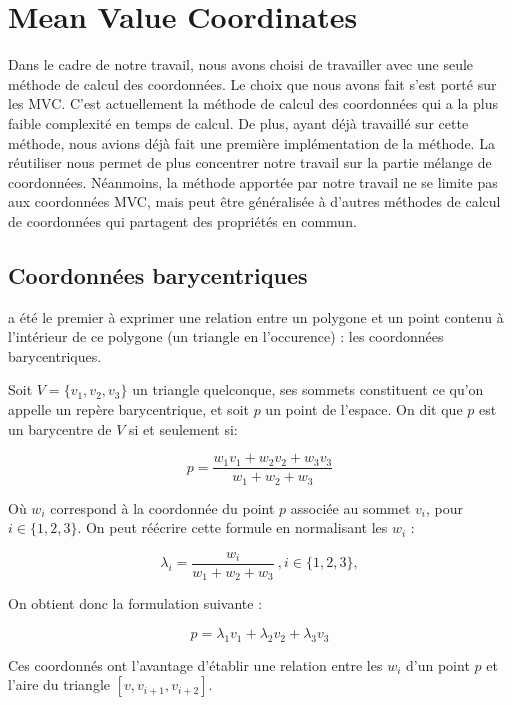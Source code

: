 \section{Mean Value Coordinates}

Dans le cadre de notre travail, nous avons choisi de travailler avec une seule
méthode de calcul des coordonnées. Le choix que nous avons fait s'est porté
sur les MVC. C'est actuellement la méthode de calcul des coordonnées qui a la
plus faible complexité en temps de calcul. De plus, ayant déjà travaillé sur
cette méthode, nous avions déjà fait une première implémentation de la
méthode. La réutiliser nous permet de plus concentrer notre travail sur la
partie mélange de coordonnées. Néanmoins, la méthode apportée par notre
travail ne se limite pas aux coordonnées MVC, mais peut être généralisée à
d'autres méthodes de calcul de coordonnées qui partagent des propriétés en
commun.

\subsection{Coordonnées barycentriques}

\cite{Mob27} a été le premier à exprimer une relation entre un polygone et un
point contenu à l'intérieur de ce polygone (un triangle en l'occurence) : les
coordonnées barycentriques.

Soit $V = \{v_1, v_2, v_3\}$ un triangle quelconque, ses sommets constituent ce
qu'on appelle un repère barycentrique, et soit $p$ un point de l'espace. On dit
que $p$ est un barycentre de $V$ si et seulement si:

\begin{equation}
  p = \frac{w_1 v_1 + w_2 v_2 + w_3 v_3}{w_1+w_2+w_3}
\end{equation}

Où $w_i$ correspond à la coordonnée du point $p$ associée au sommet $v_i$,
pour $i \in \{1, 2, 3\}$. On peut réécrire cette formule en normalisant les
$w_i$ :

\begin{equation}
  \lambda_i = \frac{w_i}{w_1+w_2+w_3} ~, i \in \{1, 2, 3\}, 
\end{equation}

On obtient donc la formulation suivante :

\begin{equation}
  p = \lambda_1 v_1 + \lambda_2 v_2 + \lambda_3 v_3
\end{equation}

Ces coordonnés ont l'avantage d'établir une relation entre les $w_i$ d'un
point $p$ et l'aire du triangle $[v, v_{i+1}, v_{i+2}]$.

